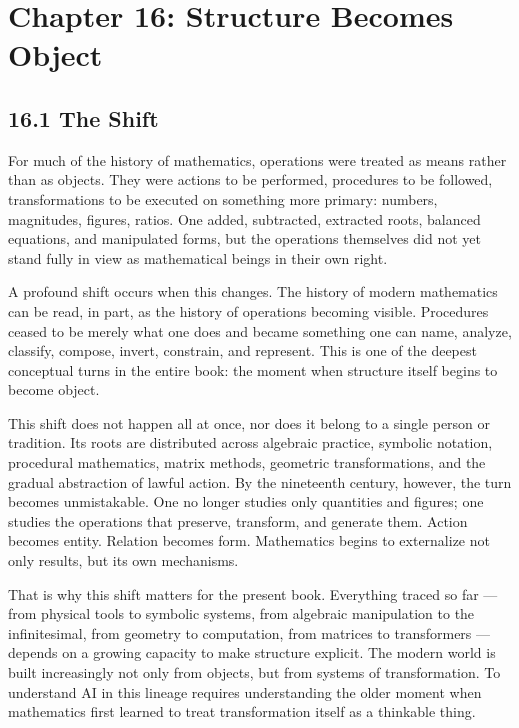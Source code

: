 \newpage
\vspace*{3cm}

\hypertarget{chapter-16-structure-becomes-object}{%
\section{Chapter 16: Structure Becomes
Object}\label{chapter-16-structure-becomes-object}}

\hypertarget{the-shift}{%
\subsection{16.1 The Shift}\label{the-shift}}

For much of the history of mathematics, operations were treated as means
rather than as objects. They were actions to be performed, procedures to
be followed, transformations to be executed on something more primary:
numbers, magnitudes, figures, ratios. One added, subtracted, extracted
roots, balanced equations, and manipulated forms, but the operations
themselves did not yet stand fully in view as mathematical beings in
their own right.

A profound shift occurs when this changes. The history of modern
mathematics can be read, in part, as the history of operations becoming
visible. Procedures ceased to be merely what one does and became
something one can name, analyze, classify, compose, invert, constrain,
and represent. This is one of the deepest conceptual turns in the entire
book: the moment when structure itself begins to become object.

This shift does not happen all at once, nor does it belong to a single
person or tradition. Its roots are distributed across algebraic
practice, symbolic notation, procedural mathematics, matrix methods,
geometric transformations, and the gradual abstraction of lawful action.
By the nineteenth century, however, the turn becomes unmistakable. One
no longer studies only quantities and figures; one studies the
operations that preserve, transform, and generate them. Action becomes
entity. Relation becomes form. Mathematics begins to externalize not
only results, but its own mechanisms.

That is why this shift matters for the present book. Everything traced
so far --- from physical tools to symbolic systems, from algebraic
manipulation to the infinitesimal, from geometry to computation, from
matrices to transformers --- depends on a growing capacity to make
structure explicit. The modern world is built increasingly not only from
objects, but from systems of transformation. To understand AI in this
lineage requires understanding the older moment when mathematics first
learned to treat transformation itself as a thinkable thing.

